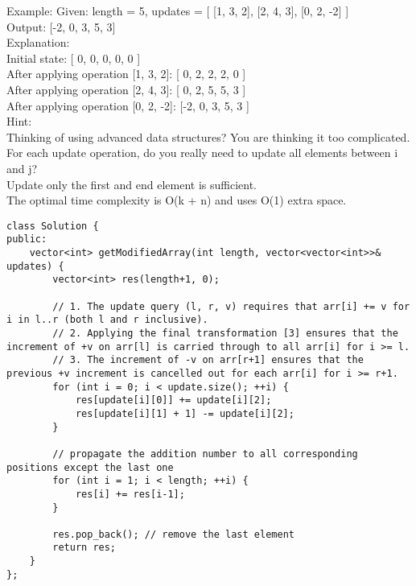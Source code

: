 Example:
Given:
    length = 5,
    updates = [
        [1,  3,  2],
        [2,  4,  3],
        [0,  2, -2]
    ]\\

Output:
    [-2, 0, 3, 5, 3]\\

Explanation:\\

Initial state:
[ 0, 0, 0, 0, 0 ]\\

After applying operation [1, 3, 2]:
[ 0, 2, 2, 2, 0 ]\\

After applying operation [2, 4, 3]:
[ 0, 2, 5, 5, 3 ]\\

After applying operation [0, 2, -2]:
[-2, 0, 3, 5, 3 ]\\

Hint:\\
    Thinking of using advanced data structures? You are thinking it too complicated.\\
    For each update operation, do you really need to update all elements between i and j?\\
    Update only the first and end element is sufficient.\\
    The optimal time complexity is O(k + n) and uses O(1) extra space.\\

\begin{lstlisting}
class Solution {
public:
    vector<int> getModifiedArray(int length, vector<vector<int>>& updates) {
        vector<int> res(length+1, 0);
        
        // 1. The update query (l, r, v) requires that arr[i] += v for i in l..r (both l and r inclusive). 
        // 2. Applying the final transformation [3] ensures that the increment of +v on arr[l] is carried through to all arr[i] for i >= l. 
        // 3. The increment of -v on arr[r+1] ensures that the previous +v increment is cancelled out for each arr[i] for i >= r+1. 
        for (int i = 0; i < update.size(); ++i) {
            res[update[i][0]] += update[i][2];      
            res[update[i][1] + 1] -= update[i][2]; 
        }
        
        // propagate the addition number to all corresponding positions except the last one
        for (int i = 1; i < length; ++i) {
            res[i] += res[i-1];                 
        }
        
        res.pop_back(); // remove the last element
        return res;
    }
};
\end{lstlisting}


